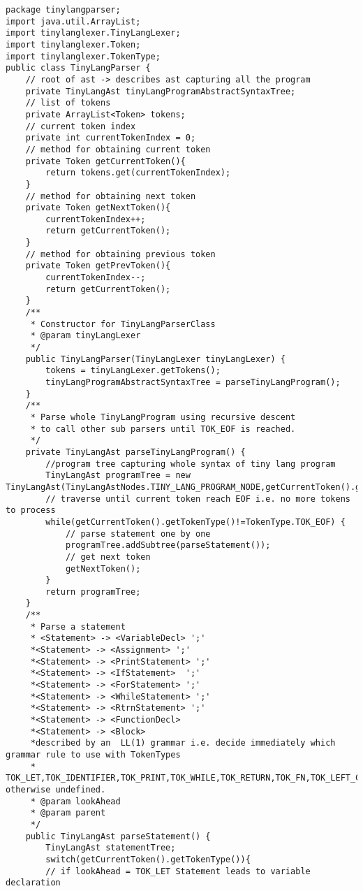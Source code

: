 \begin{lstlisting}[basicstyle=\miniscule,caption=Implementation of recursive descent parser,label=listing:rescursive descent parser implementation]
package tinylangparser;
import java.util.ArrayList;
import tinylanglexer.TinyLangLexer;
import tinylanglexer.Token;
import tinylanglexer.TokenType;
public class TinyLangParser {
	// root of ast -> describes ast capturing all the program
	private TinyLangAst tinyLangProgramAbstractSyntaxTree;
	// list of tokens
	private ArrayList<Token> tokens;
	// current token index
	private int currentTokenIndex = 0;
	// method for obtaining current token 
	private Token getCurrentToken(){
		return tokens.get(currentTokenIndex);
	}
	// method for obtaining next token 
	private Token getNextToken(){
		currentTokenIndex++;
		return getCurrentToken();	
	}
	// method for obtaining previous token 
	private Token getPrevToken(){
		currentTokenIndex--;
		return getCurrentToken();	
	}
	/**
	 * Constructor for TinyLangParserClass
	 * @param tinyLangLexer
	 */
	public TinyLangParser(TinyLangLexer tinyLangLexer) {
		tokens = tinyLangLexer.getTokens();
		tinyLangProgramAbstractSyntaxTree = parseTinyLangProgram();
	}
	/**
	 * Parse whole TinyLangProgram using recursive descent
	 * to call other sub parsers until TOK_EOF is reached.   
	 */
	private TinyLangAst parseTinyLangProgram() {
		//program tree capturing whole syntax of tiny lang program
		TinyLangAst programTree = new TinyLangAst(TinyLangAstNodes.TINY_LANG_PROGRAM_NODE,getCurrentToken().getLineNumber());
		// traverse until current token reach EOF i.e. no more tokens to process 
		while(getCurrentToken().getTokenType()!=TokenType.TOK_EOF) {
			// parse statement one by one
			programTree.addSubtree(parseStatement());
			// get next token
			getNextToken();
		}
		return programTree;
	}
	/**
  	 * Parse a statement
 	 * <Statement> -> <VariableDecl> ';'
     *<Statement> -> <Assignment> ';'
     *<Statement> -> <PrintStatement> ';'
     *<Statement> -> <IfStatement>  ';'
     *<Statement> -> <ForStatement> ';'
     *<Statement> -> <WhileStatement> ';'
     *<Statement> -> <RtrnStatement> ';'
     *<Statement> -> <FunctionDecl>
     *<Statement> -> <Block>
     *described by an  LL(1) grammar i.e. decide immediately which grammar rule to use with TokenTypes 
     *	TOK_LET,TOK_IDENTIFIER,TOK_PRINT,TOK_WHILE,TOK_RETURN,TOK_FN,TOK_LEFT_CURLY otherwise undefined.
	 * @param lookAhead
	 * @param parent
	 */
	public TinyLangAst parseStatement() {
		TinyLangAst statementTree;
		switch(getCurrentToken().getTokenType()){
		// if lookAhead = TOK_LET Statement leads to variable declaration

\end{lstlisting}
